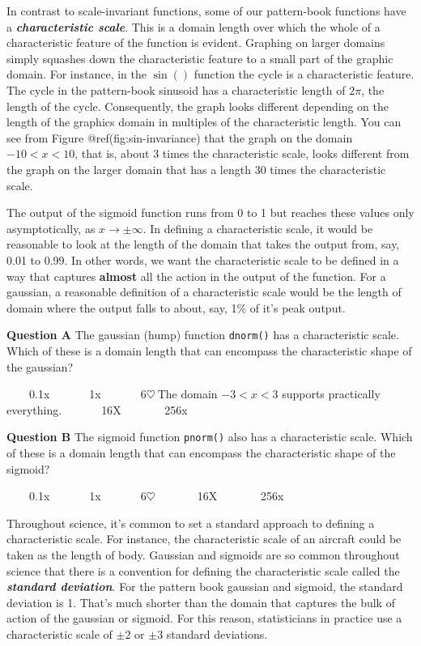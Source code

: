 \documentclass[
  letterpaper,
  DIV=11,
  numbers=noendperiod,
  oneside]{article}
\begin{document}
\begin{multicols}{2}
In contrast to scale-invariant functions, some of our pattern-book
functions have a \textbf{\emph{characteristic scale}}. This is a domain
length over which the whole of a characteristic feature of the function
is evident. Graphing on larger domains simply squashes down the
characteristic feature to a small part of the graphic domain. For
instance, in the \(\sin()\) function the cycle is a characteristic
feature. The cycle in the pattern-book sinusoid has a characteristic
length of \(2 \pi\), the length of the cycle. Consequently, the graph
looks different depending on the length of the graphics domain in
multiples of the characteristic length. You can see from Figure
@ref(fig:sin-invariance) that the graph on the domain \(-10 < x < 10\),
that is, about 3 times the characteristic scale, looks different from
the graph on the larger domain that has a length 30 times the
characteristic scale.

The output of the sigmoid function runs from 0 to 1 but reaches these
values only asymptotically, as \(x \rightarrow \pm \infty\). In defining
a characteristic scale, it would be reasonable to look at the length of
the domain that takes the output from, say, 0.01 to 0.99. In other
words, we want the characteristic scale to be defined in a way that
captures \textbf{almost} all the action in the output of the function.
For a gaussian, a reasonable definition of a characteristic scale would
be the length of domain where the output falls to about, say, 1\% of
it's peak output.

\textbf{Question A} The gaussian (hump) function \texttt{dnorm()} has a
characteristic scale. Which of these is a domain length that can
encompass the characteristic shape of the gaussian?

~~~~{0.1{x}}~~~~~~~{1{x}}~~~~~~~{6{\(\heartsuit\ \)The domain
\(-3 < x < 3\) supports practically everything.}}~~~~~~~{16{︎X
}}~~~~~~~{256{x}}

\textbf{Question B} The sigmoid function \texttt{pnorm()} also has a
characteristic scale. Which of these is a domain length that can
encompass the characteristic shape of the sigmoid?

~~~~{0.1{x}}~~~~~~~{1{x}}~~~~~~~{6{\(\heartsuit\ \)}}~~~~~~~{16{︎X
}}~~~~~~~{256{x}}

Throughout science, it's common to set a standard approach to defining a
characteristic scale. For instance, the characteristic scale of an
aircraft could be taken as the length of body. Gaussian and sigmoids are
so common throughout science that there is a convention for defining the
characteristic scale called the \textbf{\emph{standard deviation}}. For
the pattern book gaussian and sigmoid, the standard deviation is 1.
That's much shorter than the domain that captures the bulk of action of
the gaussian or sigmoid. For this reason, statisticians in practice use
a characteristic scale of \(\pm 2\) or \(\pm 3\) standard deviations.


\end{multicols}
\end{document}
